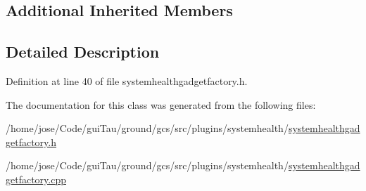 \subsection*{Additional Inherited Members}


\subsection{Detailed Description}


Definition at line 40 of file systemhealthgadgetfactory.\-h.



The documentation for this class was generated from the following files\-:\begin{DoxyCompactItemize}
\item 
/home/jose/\-Code/gui\-Tau/ground/gcs/src/plugins/systemhealth/\hyperlink{systemhealthgadgetfactory_8h}{systemhealthgadgetfactory.\-h}\item 
/home/jose/\-Code/gui\-Tau/ground/gcs/src/plugins/systemhealth/\hyperlink{systemhealthgadgetfactory_8cpp}{systemhealthgadgetfactory.\-cpp}\end{DoxyCompactItemize}
